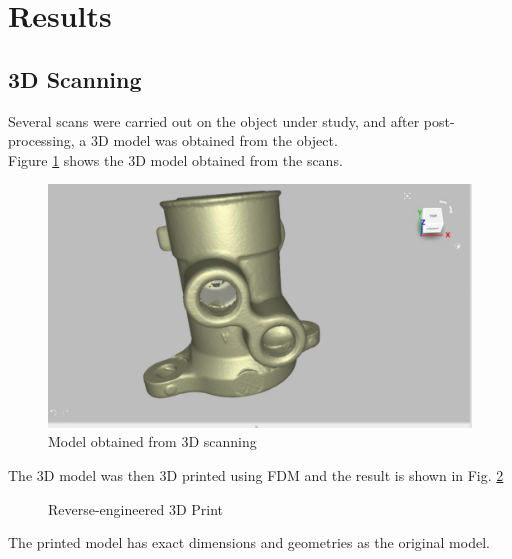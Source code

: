 \section{Results}
\subsection{3D Scanning}
Several scans were carried out on the object under study, and after post-processing, a 3D model was obtained from the object.\\
Figure \ref{fig:scanned} shows the 3D model obtained from the scans.
 \begin{center}
 	\begin{figure}[!h]
 	\centering
 	\includegraphics[width=0.64\linewidth]{Figures/Figure 1}
 	\caption[Scanned 3D model]{Model obtained from 3D scanning}
 	\label{fig:scanned}
 	\end{figure}
 \end{center}
The 3D model was then 3D printed using FDM and the result is shown in Fig. \ref{fig:result}
\begin{figure}[!h]%
	\centering
	\qquad
	\caption{Reverse-engineered 3D Print}%
	\label{fig:result}%
\end{figure}
The printed model has exact dimensions and geometries as the original model.